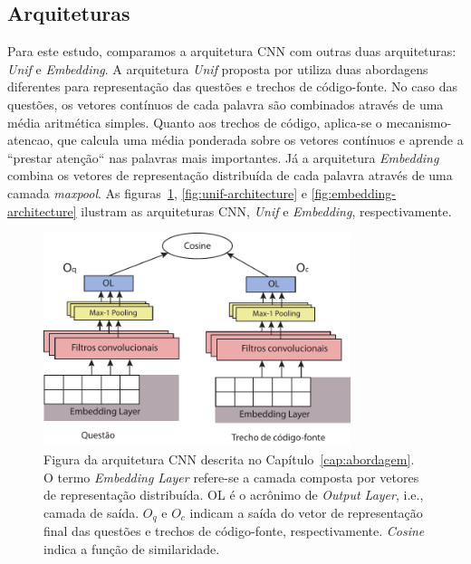 \subsection{Arquiteturas}

Para este estudo, comparamos a arquitetura CNN com outras duas arquiteturas: \textit{Unif} e \textit{Embedding}. A arquitetura \textit{Unif} proposta por \cite{cambronero-deep-learning-code-search:2019} utiliza duas abordagens diferentes para representação das questões e trechos de código-fonte. No caso das questões, os vetores contínuos de cada palavra são combinados através de uma média aritmética simples. Quanto aos trechos de código, aplica-se o \gls{mecanismo-atencao}, que calcula uma média ponderada sobre os vetores contínuos e aprende a ``prestar atenção`` nas palavras mais importantes.  Já a arquitetura \textit{Embedding} combina os vetores de representação distribuída de cada palavra através de uma camada \textit{maxpool}. As figuras~\ref{fig:cnn-architecture}, \ref{fig:unif-architecture} e \ref{fig:embedding-architecture} ilustram as arquiteturas CNN, \textit{Unif} e \textit{Embedding}, respectivamente.
\begin{figure}[h]
    \centering
    \includegraphics[width=0.8\textwidth]{figuras/cap-experimento/cnn-architecture-proposal.pdf}
    \caption[Figura da arquitetura CNN descrita no Capítulo~\ref{cap:abordagem}.]{Figura da arquitetura CNN descrita no Capítulo~\ref{cap:abordagem}. O termo \emph{Embedding Layer} refere-se a camada composta por vetores de representação distribuída. OL é o acrônimo de \emph{Output Layer}, i.e., camada de saída. $O_{q}$ e $O_{c}$ indicam a saída do vetor de representação final das questões e trechos de código-fonte, respectivamente. \emph{Cosine} indica a função de similaridade.}
    \label{fig:cnn-architecture}
\end{figure}


